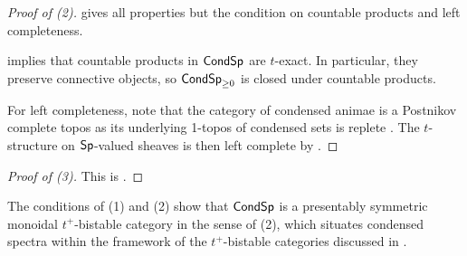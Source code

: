 \begin{proof}[Proof of (2)]
    \cite[Prop. 1.3.2.7]{SAG} gives all properties but the condition on countable products and left completeness. 

    \cite[Lem. 4.10 (4)]{ClausenLie} implies that countable products in $\mathsf{Cond}\mathsf{Sp}$ are $t$-exact. In particular, they preserve connective objects, so $\mathsf{Cond}\mathsf{Sp}_{\geq0}$ is closed under countable products. 

    For left completeness, note that the category of condensed animae is a Postnikov complete topos \cite[Thm. A]{PostnikovReplete} as its underlying 1-topos of condensed sets is replete \cite[Prop. 2.1.4 \& Rmk. 2.2.2]{CamargoSolid}. The $t$-structure on $\mathsf{Sp}$-valued sheaves is then left complete by \cite[Cor. 3.26]{PostnikovReplete}. 
\end{proof}
\begin{proof}[Proof of (3)]
    This is \cite[Cor. 2.6.7 \& 2.6.9]{BrinkCondensed}. 
\end{proof}
\begin{remark}\label{rmk: CondSp is pres sym mon t plus bistable}
    The conditions of  (1) and (2) show that $\mathsf{Cond}\mathsf{Sp}$ is a presentably symmetric monoidal $t^{+}$-bistable category in the sense of  (2), which situates condensed spectra within the framework of the $t^{+}$-bistable categories discussed in . 
\end{remark}
